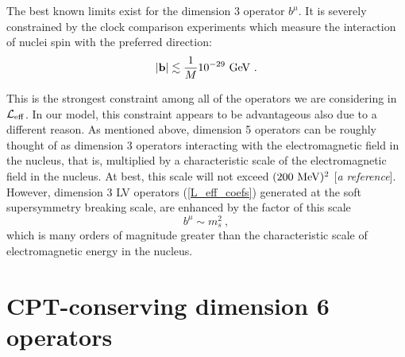 \documentclass[a4paper,12pt]{article}
\begin{document}
	The best known limits exist for the dimension 3 operator
	$ b^\mu $.
	It is severely constrained by the clock comparison experiments which
	measure the interaction of nuclei spin with the preferred
	direction:
\begin{equation}
	| {\mathbf b} | \lesssim \frac{1}{M} 10^{-29}~{\rm GeV}
        ~.
\end{equation}

	This is the strongest constraint among all of the operators
	we are considering in $ \mathcal{L}_{\rm eff} $.
	In our model, this constraint appears to be advantageous
	also due to a different reason.
	As mentioned above, dimension 5 operators can be roughly
	thought of as dimension 3 operators interacting with the
	electromagnetic field in the nucleus, that is,
	multiplied by a characteristic scale of the electromagnetic
	field in the nucleus.
	At best, this scale will not exceed $ (200\ {\rm MeV})^2 $
	[{\it a reference}].
	However, dimension 3 LV operators (\ref{L_eff_coefs}) 
	generated at the soft
	supersymmetry breaking scale, are enhanced by the factor
	of this scale
\[
	b^\mu \sim m_s^2~,
\]
	which is many orders of magnitude greater than the characteristic
	scale of electromagnetic energy in the nucleus.
	

\section{CPT-conserving dimension 6 operators}
\label{Dim6}
\end{document}
